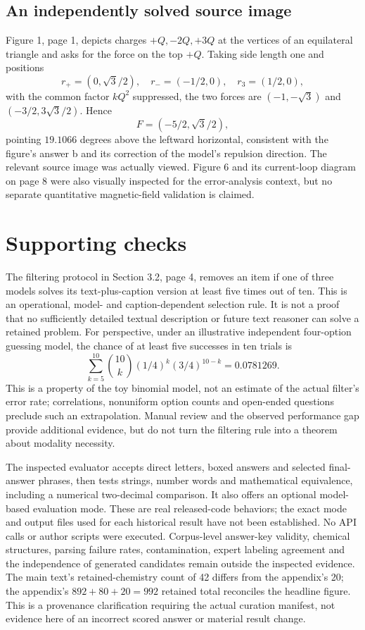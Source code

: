 \documentclass[10pt]{article}
\begin{document}
\subsection*{An independently solved source image}
Figure 1, page 1, depicts charges \(+Q,-2Q,+3Q\) at the vertices of an equilateral triangle and asks for the force on the top \(+Q\). Taking side length one and positions \[r_+=(0,\sqrt3/2),\quad r_-=(-1/2,0),\quad r_3=(1/2,0),\] with the common factor \(kQ^2\) suppressed, the two forces are \((-1,-\sqrt3)\) and \((-3/2,3\sqrt3/2)\). Hence \[F=(-5/2,\sqrt3/2),\] pointing \(19.1066\) degrees above the leftward horizontal, consistent with the figure’s answer b and its correction of the model’s repulsion direction. The relevant source image was actually viewed. Figure 6 and its current-loop diagram on page 8 were also visually inspected for the error-analysis context, but no separate quantitative magnetic-field validation is claimed.\par
\section*{Supporting checks}
The filtering protocol in Section 3.2, page 4, removes an item if one of three models solves its text-plus-caption version at least five times out of ten. This is an operational, model- and caption-dependent selection rule. It is not a proof that no sufficiently detailed textual description or future text reasoner can solve a retained problem. For perspective, under an illustrative independent four-option guessing model, the chance of at least five successes in ten trials is \[\sum_{k=5}^{10}\binom{10}{k}(1/4)^k(3/4)^{10-k}=0.0781269.\] This is a property of the toy binomial model, not an estimate of the actual filter’s error rate; correlations, nonuniform option counts and open-ended questions preclude such an extrapolation. Manual review and the observed performance gap provide additional evidence, but do not turn the filtering rule into a theorem about modality necessity.\par
The inspected evaluator accepts direct letters, boxed answers and selected final-answer phrases, then tests strings, number words and mathematical equivalence, including a numerical two-decimal comparison. It also offers an optional model-based evaluation mode. These are real released-code behaviors; the exact mode and output files used for each historical result have not been established. No API calls or author scripts were executed. Corpus-level answer-key validity, chemical structures, parsing failure rates, contamination, expert labeling agreement and the independence of generated candidates remain outside the inspected evidence. The main text’s retained-chemistry count of 42 differs from the appendix’s 20; the appendix’s \(892+80+20=992\) retained total reconciles the headline figure. This is a provenance clarification requiring the actual curation manifest, not evidence here of an incorrect scored answer or material result change.\par
\end{document}
